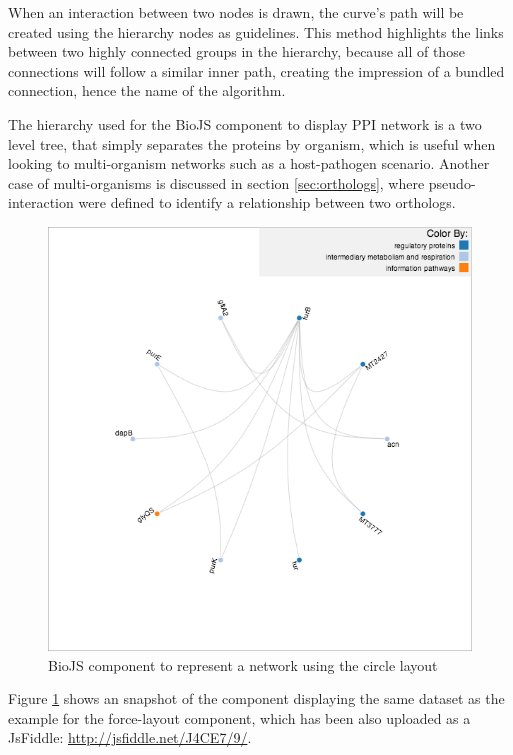 When an interaction between two nodes is drawn, the curve's path will be created using the hierarchy nodes as guidelines. This method highlights the links between two highly connected groups in the hierarchy, because all of those connections will follow a similar inner path, creating the impression of a bundled connection, hence the name of the algorithm.

The hierarchy used for the BioJS component to display PPI network is a two level tree, that simply separates the proteins by organism, which is useful when looking to multi-organism networks such as a host-pathogen scenario. Another case of multi-organisms is discussed in section \ref{sec:orthologs}, where pseudo-interaction were defined to identify a relationship between two orthologs.

\begin{figure}[ht]
\centering
\includegraphics[width=5in]{figures/circle.png}
\caption[BioJS component to represent a network using the circle layout]{BioJS component to represent a network using the circle layout
\label{fig:biojs_circle}}
\end{figure}

Figure \ref{fig:biojs_circle} shows an snapshot of the component displaying the same dataset as the example for the force-layout component, which has been also uploaded as a JsFiddle: \url{http://jsfiddle.net/J4CE7/9/}.


